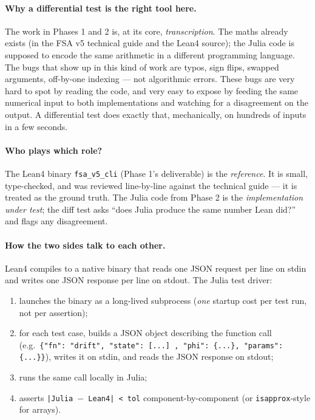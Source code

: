 \documentclass[11pt,a4paper]{article}
\begin{document}
\paragraph{Why a differential test is the right tool here.} The work
in Phases 1 and 2 is, at its core, \emph{transcription}. The maths
already exists (in the FSA v5 technical guide and the Lean4 source);
the Julia code is supposed to encode the same arithmetic in a
different programming language. The bugs that show up in this kind
of work are typos, sign flips, swapped arguments, off-by-one
indexing --- not algorithmic errors. These bugs are very hard to
spot by reading the code, and very easy to expose by feeding the
same numerical input to both implementations and watching for a
disagreement on the output. A differential test does exactly that,
mechanically, on hundreds of inputs in a few seconds.

\paragraph{Who plays which role?} The Lean4 binary
\texttt{fsa\_v5\_cli} (Phase 1's deliverable) is the \emph{reference}.
It is small, type-checked, and was reviewed line-by-line against
the technical guide --- it is treated as the ground truth. The
Julia code from Phase 2 is the \emph{implementation under test};
the diff test asks ``does Julia produce the same number Lean did?''
and flags any disagreement.

\paragraph{How the two sides talk to each other.} Lean4 compiles
to a native binary that reads one JSON request per line on stdin
and writes one JSON response per line on stdout. The Julia test
driver:

\begin{enumerate}[itemsep=2pt]
  \item launches the binary as a long-lived subprocess (\emph{one}
        startup cost per test run, not per assertion);
  \item for each test case, builds a JSON object describing the
        function call (e.g.\ \texttt{\{"fn": "drift", "state": [...]
        , "phi": \{...\}, "params": \{...\}\}}), writes it on
        stdin, and reads the JSON response on stdout;
  \item runs the same call locally in Julia;
  \item asserts \texttt{|Julia $-$ Lean4| < tol} component-by-component
        (or \texttt{isapprox}-style for arrays).
\end{enumerate}
\end{document}
